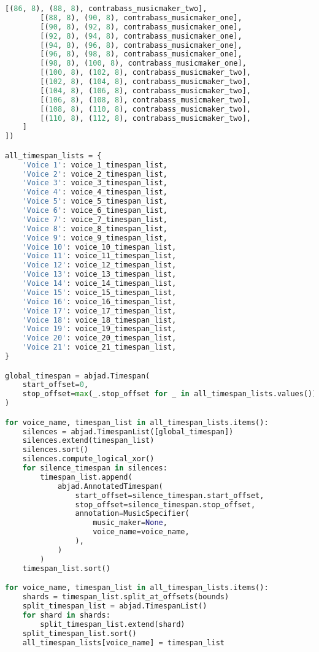 \begin{lstlisting}[language=Python, caption=Invocation Source Code]
        [(86, 8), (88, 8), contrabass_musicmaker_two],
        [(88, 8), (90, 8), contrabass_musicmaker_one],
        [(90, 8), (92, 8), contrabass_musicmaker_one],
        [(92, 8), (94, 8), contrabass_musicmaker_one],
        [(94, 8), (96, 8), contrabass_musicmaker_one],
        [(96, 8), (98, 8), contrabass_musicmaker_one],
        [(98, 8), (100, 8), contrabass_musicmaker_one],
        [(100, 8), (102, 8), contrabass_musicmaker_two],
        [(102, 8), (104, 8), contrabass_musicmaker_two],
        [(104, 8), (106, 8), contrabass_musicmaker_two],
        [(106, 8), (108, 8), contrabass_musicmaker_two],
        [(108, 8), (110, 8), contrabass_musicmaker_two],
        [(110, 8), (112, 8), contrabass_musicmaker_two],
    ]
])

all_timespan_lists = {
    'Voice 1': voice_1_timespan_list,
    'Voice 2': voice_2_timespan_list,
    'Voice 3': voice_3_timespan_list,
    'Voice 4': voice_4_timespan_list,
    'Voice 5': voice_5_timespan_list,
    'Voice 6': voice_6_timespan_list,
    'Voice 7': voice_7_timespan_list,
    'Voice 8': voice_8_timespan_list,
    'Voice 9': voice_9_timespan_list,
    'Voice 10': voice_10_timespan_list,
    'Voice 11': voice_11_timespan_list,
    'Voice 12': voice_12_timespan_list,
    'Voice 13': voice_13_timespan_list,
    'Voice 14': voice_14_timespan_list,
    'Voice 15': voice_15_timespan_list,
    'Voice 16': voice_16_timespan_list,
    'Voice 17': voice_17_timespan_list,
    'Voice 18': voice_18_timespan_list,
    'Voice 19': voice_19_timespan_list,
    'Voice 20': voice_20_timespan_list,
    'Voice 21': voice_21_timespan_list,
}

global_timespan = abjad.Timespan(
    start_offset=0,
    stop_offset=max(_.stop_offset for _ in all_timespan_lists.values())
)

for voice_name, timespan_list in all_timespan_lists.items():
    silences = abjad.TimespanList([global_timespan])
    silences.extend(timespan_list)
    silences.sort()
    silences.compute_logical_xor()
    for silence_timespan in silences:
        timespan_list.append(
            abjad.AnnotatedTimespan(
                start_offset=silence_timespan.start_offset,
                stop_offset=silence_timespan.stop_offset,
                annotation=MusicSpecifier(
                    music_maker=None,
                    voice_name=voice_name,
                ),
            )
        )
    timespan_list.sort()

for voice_name, timespan_list in all_timespan_lists.items():
    shards = timespan_list.split_at_offsets(bounds)
    split_timespan_list = abjad.TimespanList()
    for shard in shards:
        split_timespan_list.extend(shard)
    split_timespan_list.sort()
    all_timespan_lists[voice_name] = timespan_list


\end{lstlisting}
